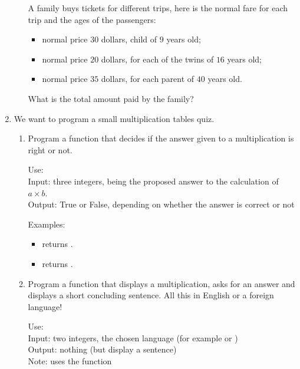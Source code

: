 \documentclass[11pt,class=report,crop=false]{standalone}
\begin{document}
\begin{activite}
\begin{enumerate}
\begin{enumerate}
  A family buys tickets for different trips, here is the normal fare for each trip and the ages of the passengers: 
  \begin{itemize}
    \item normal price $30$ dollars, child of $9$ years old;
    
    \item normal price $20$ dollars, for each of the twins of $16$ years old;
    
    \item normal price $35$ dollars, for each parent of $40$ years old.
  \end{itemize}
  What is the total amount paid by the family?
 
  \end{enumerate}
  
  
  \item We want to program a small multiplication tables quiz.
  
  \begin{enumerate}
    \item Program a function  that decides if the answer given to a multiplication is right or not.
    
\begin{fonction}
  Use:  \\
  Input: three integers,  being the proposed answer to the calculation of $a \times b$.\\
  Output: \og{}True\fg{} or \og{}False\fg{}, depending on whether the answer is correct or not
  
  \medskip
    
  Examples: 
  \begin{itemize}
    \item {} returns .
    \item {} returns .
  \end{itemize}
  \end{fonction}  
  
  
    \item Program a function that displays a multiplication, asks for an answer and displays a short concluding sentence. All this in English or a foreign language!
    
\begin{fonction}
  Use:  \\
  Input: two integers, the chosen language (for example  or )\\
  Output: nothing (but display a sentence)\\
  Note: uses the function 
  

\end{fonction}
\end{enumerate}
\end{enumerate}
\end{activite}
\end{document}
